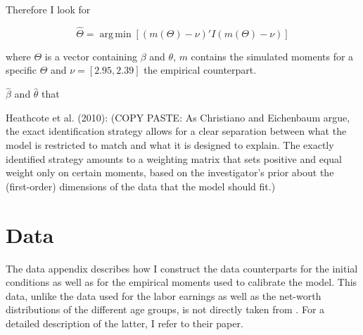 \documentclass[12pt,a4paper,leqno]{article}
\theoremstyle{definition}
\begin{document}
Therefore I look for 

\[ \widehat{\Theta} = \operatorname{arg\,min}[(m(\Theta )-\nu)'I(m(\Theta )-\nu)] \]

where $\Theta$ is a vector containing $\beta$ and $\theta$, $m$ contains the simulated moments for a specific $\Theta$ and $\nu = [2.95,2.39]$ the empirical counterpart. 

$\hat{\beta}$ and $\hat{\theta}$ that 




Heathcote et al. (2010): (COPY PASTE: As Christiano and Eichenbaum argue, the exact identification strategy allows for a clear separation between what the model is restricted to match and what it is designed to explain. The exactly identified strategy amounts to a weighting matrix that sets positive and equal weight only on certain moments, based on the investigator's prior about the (first-order) dimensions of the data that the model should fit.)

\section{Data}
\label{data}
The data appendix describes how I construct the data counterparts for the initial conditions as well as for the empirical moments used to calibrate the model. This data, unlike the data used for the labor earnings as well as the net-worth distributions of the different age groups, is not directly taken from \cite{hintermaier2011}. For a detailed description of the latter, I refer to their paper. \\
\end{document}
